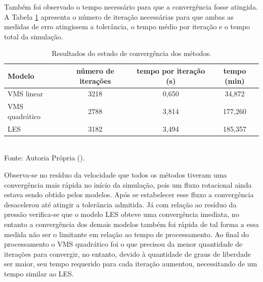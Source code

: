 Também foi observado o tempo necessário para que a convergência fosse atingida. A Tabela \ref{tab:comp-res} apresenta o número de iteração necessárias para que ambas as medidas de erro atingissem a tolerância, o tempo médio por iteração e o tempo total da simulação.

\begin{table}[h!]
    \centering
    \caption{Resultados do estudo de convergência dos métodos.}
    \begin{tabular}{lccc}
        \hline
        Modelo         & número de iterações & tempo por iteração (s) & tempo (min) \\\hline
        VMS linear     & 3218                & 0,650                  & 34,872      \\
        VMS quadrático & 2788                & 3,814                  & 177,260     \\
        LES            & 3182                & 3,494                  & 185,357     \\\hline
    \end{tabular}
    \\Fonte: Autoria Própria (\the\year).
    \label{tab:comp-res}
\end{table}

Observa-se no resíduo da velocidade que todos os métodos tiveram uma convergência mais rápida no início da simulação, pois um fluxo rotacional ainda estava sendo obtido pelos modelos. Após se estabelecer esse fluxo a convergência desacelerou até atingir a tolerância admitida. Já com relação ao resíduo da pressão verifica-se que o modelo LES obteve uma convergência imediata, no entanto a convergência dos demais modelos também foi rápida de tal forma a essa medida não ser o limitante em relação ao tempo de processamento. Ao final do processamento o VMS quadrático foi o que precisou da menor quantidade de iterações para convergir, no entanto, devido à quantidade de graus de liberdade ser maior, seu tempo requerido para cada iteração aumentou, necessitando de um tempo similar ao LES.